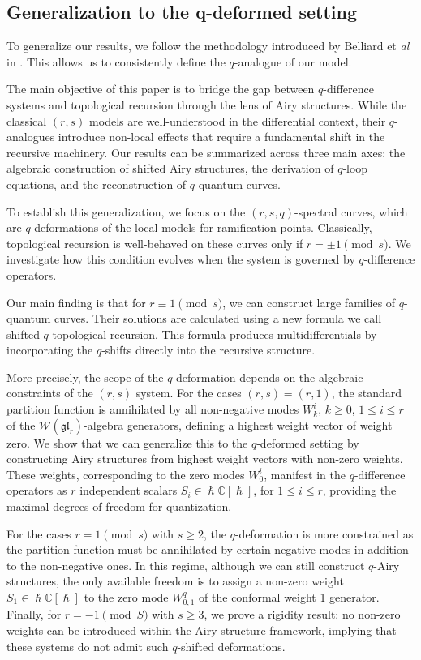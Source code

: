 \documentclass[reqno,11pt]{amsart}
\theoremstyle{plain}
\theoremstyle{definition}
\theoremstyle{remark}
\numberwithin{equation}{section}
\newcommand{\mb}[1]{\mathbb{#1}}
\newcommand{\1}{\mathds{1}}
\newcommand{\C}{\mb{C}}
\newcommand{\2}{\frac{1}{2}}
\begin{document}
	\subsection{Generalization to the q-deformed setting}
	To generalize our results, we follow the methodology introduced by Belliard et {\it al} in \cite{BBKN25}. This allows us to consistently define the $q$-analogue of our model.
	
	The main objective of this paper is to bridge the gap between $q$-difference systems and topological recursion through the lens of Airy structures. While the classical $(r,s)$ models are well-understood in the differential context, their $q$-analogues introduce non-local effects that require a fundamental shift in the recursive machinery. Our results can be summarized across three main axes: the algebraic construction of shifted Airy structures, the derivation of $q$-loop equations, and the reconstruction of $q$-quantum curves.
	
	To establish this generalization, we focus on the $(r,s,q)$-spectral curves, which are $q$-deformations of the local models for ramification points.  Classically, topological recursion is well-behaved on these curves only if $ r = \pm 1 \pmod{s}$\cite{BBCCN18}. We investigate how  this condition evolves when the system is governed by $q$-difference operators. 
	
	Our main finding is that for $r\equiv 1\pmod s$, we can construct large families of $q$-quantum curves. Their solutions are calculated using a new formula we call shifted $q$-topological recursion. This formula produces  multidifferentials by incorporating the $q$-shifts directly into the recursive structure.

	More precisely, the scope of the $q$-deformation depends on the algebraic constraints of the $(r,s)$ system. For the cases $(r,s)=(r,1)$, the standard partition function is annihilated by all non-negative modes $W^i_k$, $k \geq 0$, $1 \leq i \leq r$ of the $\mathcal{W}(\mathfrak{gl}_r)$-algebra generators, defining a highest weight vector of weight zero. We show that we can generalize this to the $q$-deformed setting by constructing Airy structures from highest weight vectors with non-zero weights. These weights, corresponding to the zero modes $W^i_0$, manifest in the $q$-difference operators as $r$ independent scalars $ S_i \in \hslash \C [ \hslash ] $, for $ 1 \leq i \leq r$,  providing the maximal degrees of freedom for quantization.
	
	For the cases $r = 1 \pmod{s}$ with $s \geq 2$, the $q$-deformation is more constrained as the partition function must be annihilated by certain negative modes in addition to the non-negative ones. In this regime, although we can still construct $q$-Airy structures, the only available freedom is to assign a non-zero weight $S_1 \in \hslash \C [ \hslash ]$ to the zero mode $W^q_{0,1}$ of the conformal weight 1 generator. Finally, for $r =-1 \pmod{S}$ with $s \geq 3$, we prove a rigidity result: no non-zero weights can be introduced within the Airy structure framework, implying that these systems do not admit such $q$-shifted deformations.
	
\end{document}
